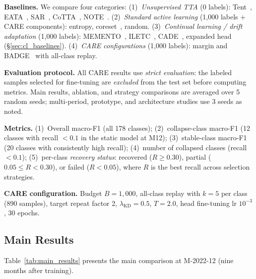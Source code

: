 \documentclass[journal]{IEEEtran}
\newcommand{\ours}{CARE}  %
\begin{document}
\textbf{Baselines.}
We compare four categories:
(1)~\textit{Unsupervised TTA} (0 labels): Tent~\cite{wang2021tent}, EATA~\cite{niu2022eata}, SAR~\cite{niu2023sar}, CoTTA~\cite{wang2022cotta}, NOTE~\cite{gong2022note}.
(2)~\textit{Standard active learning} (1{,}000 labels + \ours{} components): entropy, coreset~\cite{sener2018coreset}, random.
(3)~\textit{Continual learning / drift adaptation} (1{,}000 labels): MEMENTO~\cite{cerasuolo2024memento}, ILETC~\cite{zhu2023iletc}, CADE~\cite{yang2021cade}, expanded head (\S\ref{sec:cl_baselines}).
(4)~\textit{\ours{} configurations} (1{,}000 labels): margin and BADGE~\cite{ash2020badge} with all-class replay.

\textbf{Evaluation protocol.}
All \ours{} results use \textit{strict evaluation}: the labeled samples selected for fine-tuning are \textit{excluded} from the test set before computing metrics.
Main results, ablation, and strategy comparisons are averaged over 5 random seeds; multi-period, prototype, and architecture studies use 3 seeds as noted.

\textbf{Metrics.}
(1)~Overall macro-F1 (all 178 classes);
(2)~collapse-class macro-F1 (12 classes with recall ${<}0.1$ in the static model at M12);
(3)~stable-class macro-F1 (20 classes with consistently high recall);
(4)~number of collapsed classes (recall ${<}0.1$);
(5)~per-class \textit{recovery status}: recovered ($R{\geq}0.30$), partial ($0.05{\leq}R{<}0.30$), or failed ($R{<}0.05$), where $R$ is the best recall across selection strategies.

\textbf{\ours{} configuration.}
Budget $B{=}1{,}000$, all-class replay with $k{=}5$ per class (890 samples), target repeat factor 2, $\lambda_{\text{KD}}{=}0.5$, $T{=}2.0$, head fine-tuning lr $10^{-3}$, 30 epochs.

\subsection{Main Results}
\label{sec:main_results}

Table~\ref{tab:main_results} presents the main comparison at M-2022-12 (nine months after training).
\end{document}
